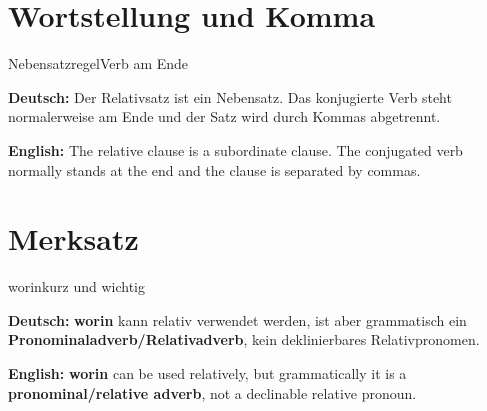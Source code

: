 \documentclass[a4paper,11pt]{article}
\newcommand{\GermanText}[1]{\textbf{Deutsch: }#1\par}
\newcommand{\EnglishText}[1]{{\small\color{SoftGray}\textbf{English: }#1\par}}
\begin{document}
\section{Wortstellung und Komma}

\begin{grammarentry}{Nebensatzregel}{Verb am Ende}

\GermanText{Der Relativsatz ist ein Nebensatz. Das konjugierte Verb steht normalerweise am Ende und der Satz wird durch Kommas abgetrennt.}

\EnglishText{The relative clause is a subordinate clause. The conjugated verb normally stands at the end and the clause is separated by commas.}

\end{grammarentry}

\section{Merksatz}

\begin{grammarentry}{worin}{kurz und wichtig}

\GermanText{\textbf{worin} kann relativ verwendet werden, ist aber grammatisch ein \textbf{Pronominaladverb/Relativadverb}, kein deklinierbares Relativpronomen.}

\EnglishText{\textbf{worin} can be used relatively, but grammatically it is a \textbf{pronominal/relative adverb}, not a declinable relative pronoun.}

\end{grammarentry}
\end{document}
